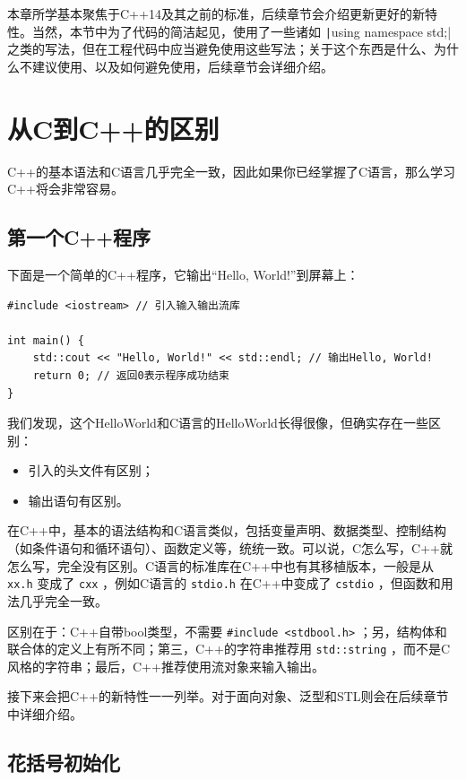 本章所学基本聚焦于C++14及其之前的标准，后续章节会介绍更新更好的新特性。当然，本节中为了代码的简洁起见，使用了一些诸如 \texttt|using namespace std;| 之类的写法，但在工程代码中应当避免使用这些写法；关于这个东西是什么、为什么不建议使用、以及如何避免使用，后续章节会详细介绍。

\section{从C到C++的区别}

C++的基本语法和C语言几乎完全一致，因此如果你已经掌握了C语言，那么学习C++将会非常容易。

\subsection{第一个C++程序}

下面是一个简单的C++程序，它输出“Hello, World!”到屏幕上：
\begin{verbatim}
#include <iostream> // 引入输入输出流库

int main() {
    std::cout << "Hello, World!" << std::endl; // 输出Hello, World!
    return 0; // 返回0表示程序成功结束
}
\end{verbatim}

我们发现，这个HelloWorld和C语言的HelloWorld长得很像，但确实存在一些区别：
\begin{itemize}
  \item 引入的头文件有区别；
  \item 输出语句有区别。
\end{itemize}

在C++中，基本的语法结构和C语言类似，包括变量声明、数据类型、控制结构（如条件语句和循环语句）、函数定义等，统统一致。可以说，C怎么写，C++就怎么写，完全没有区别。C语言的标准库在C++中也有其移植版本，一般是从 \texttt{xx.h} 变成了 \texttt{cxx} ，例如C语言的 \texttt{stdio.h} 在C++中变成了 \texttt{cstdio} ，但函数和用法几乎完全一致。

区别在于：C++自带bool类型，不需要 \texttt{\#include <stdbool.h>} ；另，结构体和联合体的定义上有所不同；第三，C++的字符串推荐用 \texttt{std::string} ，而不是C风格的字符串；最后，C++推荐使用流对象来输入输出。

接下来会把C++的新特性一一列举。对于面向对象、泛型和STL则会在后续章节中详细介绍。

\subsection{花括号初始化}


